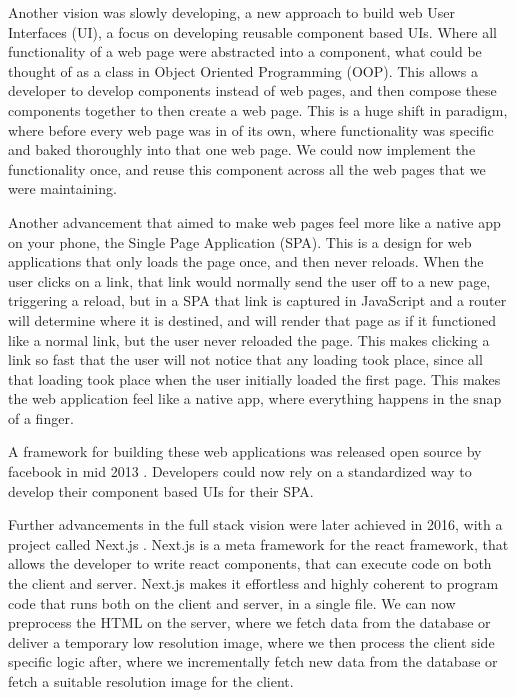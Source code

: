 \documentclass[12pt,a4paper,oneside]{book}
\begin{document}
Another vision was slowly developing, a new approach to build web User Interfaces (UI), a focus on developing reusable component based UIs.
Where all functionality of a web page were abstracted into a component, what could be thought of as a class in Object Oriented Programming (OOP).
This allows a developer to develop components instead of web pages, and then compose these components together to then create a web page.
This is a huge shift in paradigm, where before every web page was in of its own, where functionality was specific and baked thoroughly into that one web page. We could now implement the functionality once, and reuse this component across all the web pages that we were maintaining.

Another advancement that aimed to make web pages feel more like a native app on your phone, the Single Page Application (SPA). This is a design for web applications that only loads the page once, and then never reloads. When the user clicks on a link, that link would normally send the user off to a new page, triggering a reload, but in a SPA that link is captured in JavaScript and a router will determine where it is destined, and will render that page as if it functioned like a normal link, but the user never reloaded the page. This makes clicking a link so fast that the user will not notice that any loading took place, since all that loading took place when the user initially loaded the first page.
This makes the web application feel like a native app, where everything happens in the snap of a finger.

A framework for building these web applications was released open source by facebook in mid 2013 \cite{react_release}.
Developers could now rely on a standardized way to develop their component based UIs for their SPA.

Further advancements in the full stack vision were later achieved in 2016, with a project called Next.js \cite{nextjs_release}.
Next.js is a meta framework for the react framework, that allows the developer to write react components, that can execute code on both the client and server. Next.js makes it effortless and highly coherent to program code that runs both on the client and server, in a single file. We can now preprocess the HTML on the server, where we fetch data from the database or deliver a temporary low resolution image, where we then process the client side specific logic after, where we incrementally fetch new data from the database or fetch a suitable resolution image for the client.
\end{document}
